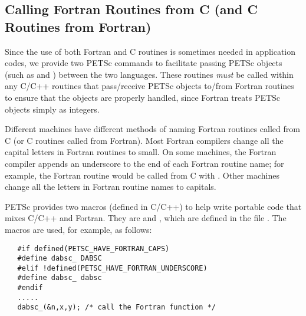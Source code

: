 \subsection{Calling Fortran Routines from C (and C Routines from Fortran)}

Since the use of both Fortran and C routines is sometimes needed in
application codes, we provide two PETSc commands to facilitate passing
PETSc objects (such as  and ) between the two
languages.  These routines {\em must} be called within any C/C++
routines that pass/receive PETSc objects to/from Fortran routines to
ensure that the objects are properly handled, since Fortran treats PETSc
objects simply as integers.


Different machines have
different methods of naming Fortran routines called from C 
(or C routines called from Fortran). Most Fortran compilers change
all the capital letters in Fortran routines to small. On some machines, the 
Fortran compiler appends an underscore to the end of each Fortran 
routine name; for example, the Fortran routine 
would be called from C with .  Other machines
change all the letters in Fortran routine names to capitals. 

PETSc provides two macros (defined in C/C++) to help write 
portable code that mixes C/C++ and Fortran. They are 
 and 
 ,
which are defined in the file .
The macros are used, for example, as follows:
\begin{verbatim}
   #if defined(PETSC_HAVE_FORTRAN_CAPS)
   #define dabsc_ DABSC
   #elif !defined(PETSC_HAVE_FORTRAN_UNDERSCORE)
   #define dabsc_ dabsc
   #endif
   .....
   dabsc_(&n,x,y); /* call the Fortran function */
\end{verbatim}

